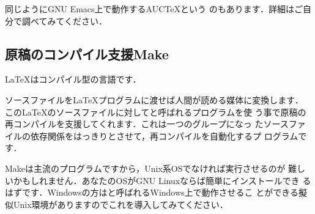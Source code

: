 同じようにGNU Emacs上で動作する{AUC\TeX}という
のもあります．詳細はご自分で調べてみてください．



%
%




\subsection{原稿のコンパイル支援\zdash Make}

\newcommand*\MakeTabSkip{\hbox to 5em{\rightarrowfill}}

{\LaTeX}は{コンパイル型}の言語です．

ソースファイルを{\LaTeX}プログラムに渡せば人間が読める媒体に変換します．
この{\LaTeX}のソースファイルに対してと呼ばれるプログラムを使
う事で原稿の再コンパイルを支援してくれます．これは一つのグループになっ
たソースファイルの依存関係をはっきりとさせて，再コンパイルを自動化するプ
ログラムです．

Makeは\unixos 主流のプログラムですから，Unix系OSでなければ実行させるのが
難しいかもしれません．あなたのOSがGNU Linuxならば簡単にインストールでき
るはずです．Windowsの方はと呼ばれるWindows上で動作させるこ
とができる擬似Unix環境がありますのでこれを導入してみてください．

